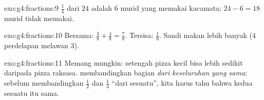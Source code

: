\begin{solution}{exo:g4:fractions:9}
$\frac14$ dari $24$ adalah $6$ murid yang memakai kacamata;
$24 - 6 = 18$ murid tidak memakai.
\end{solution}

\begin{solution}{exo:g4:fractions:10}
Bersama: $\frac38 + \frac48 = \frac78$. Tersisa: $\frac18$. Sandi
makan lebih banyak ($4$ perdelapan melawan $3$).
\end{solution}

\begin{solution}{exo:g4:fractions:11}
Memang mungkin: setengah pizza kecil bisa lebih sedikit daripada
 pizza raksasa.  membandingkan bagian \emph{dari
keseluruhan yang sama}; sebelum membandingkan $\frac12$ dan
$\frac14$ ``dari sesuatu'', kita harus tahu bahwa kedua sesuatu itu sama.

\end{solution}
